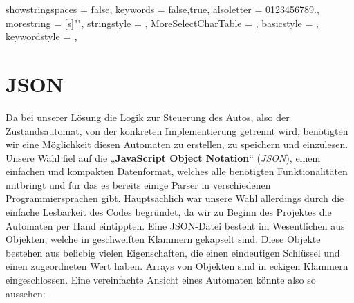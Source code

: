 \newcommand\JSONnumbervaluestyle{\color{blue}}
\newcommand\JSONstringvaluestyle{\color{red}}

\newif\ifcolonfoundonthisline

\makeatletter

{
  showstringspaces    = false,
  keywords            = {false,true},
  alsoletter          = 0123456789.,
  morestring          = [s]{"}{"},
  stringstyle         = \ifcolonfoundonthisline\JSONstringvaluestyle\fi,
  MoreSelectCharTable =%
    \colon@json{\processColon@json},
  basicstyle          = \ttfamily,
  keywordstyle        = \ttfamily\bfseries,
}

\newcommand\processColon@json{%
  \colon@json%
  \ifnum\lst@mode=\lst@Pmode%
    \global\colonfoundonthislinetrue%
  \fi
}

\lst@AddToHook{Output}{%
  \ifcolonfoundonthisline%
    \ifnum\lst@mode=\lst@Pmode%
      \def\lst@thestyle{\JSONnumbervaluestyle}%
    \fi
  \fi
  \lsthk@DetectKeywords%
}

%
  {\global\colonfoundonthislinefalse}

\makeatother

\section{JSON}
\label{sec:json}
Da bei unserer Lösung die Logik zur Steuerung des Autos, also der
Zustandsautomat, von der konkreten Implementierung getrennt wird, benötigten
wir eine Möglichkeit diesen Automaten zu erstellen, zu speichern und einzulesen.
Unsere Wahl fiel auf die „\textbf{JavaScript Object Notation}“ (\textit{JSON}), einem
einfachen und kompakten Datenformat, welches alle benötigten Funktionalitäten
mitbringt und für das es bereits einige Parser in verschiedenen
Programmiersprachen gibt. Hauptsächlich war unsere Wahl allerdings durch die
einfache Lesbarkeit des Codes begründet, da wir zu Beginn des Projektes die
Automaten per Hand eintippten.
Eine JSON-Datei besteht im Wesentlichen aus Objekten, welche in geschweiften
Klammern gekapselt sind. Diese Objekte bestehen aus beliebig vielen
Eigenschaften, die einen eindeutigen Schlüssel und einen zugeordneten Wert
haben. Arrays von Objekten sind in eckigen Klammern eingeschlossen. Eine
vereinfachte Ansicht eines Automaten könnte also so aussehen:

